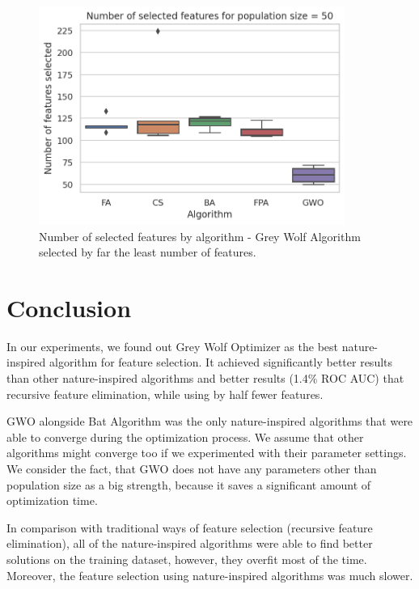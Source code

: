 \documentclass[runningheads]{llncs}
\begin{document}
\begin{figure}[ht]
	\begin{center}
	    \includegraphics[width=10cm]{figures/nia_selected_features_by_algorithm.png}
    \end{center}
	\caption{Number of selected features by algorithm - Grey Wolf Algorithm selected by far the least number of features.}
	\label{fig:nia_selected_features_by_algorithm}
\end{figure}

\section{Conclusion}

In our experiments, we found out Grey Wolf Optimizer as the best nature-inspired algorithm for feature selection. It achieved significantly better results than other nature-inspired algorithms and better results (1.4\% ROC AUC) that recursive feature elimination, while using by half fewer features.

GWO alongside Bat Algorithm was the only nature-inspired algorithms that were able to converge during the optimization process. We assume that other algorithms might converge too if we experimented with their parameter settings. We consider the fact, that GWO does not have any parameters other than population size as a big strength, because it saves a significant amount of optimization time.

In comparison with traditional ways of feature selection (recursive feature elimination), all of the nature-inspired algorithms were able to find better solutions on the training dataset, however, they overfit most of the time. Moreover, the feature selection using nature-inspired algorithms was much slower.




\end{document}
